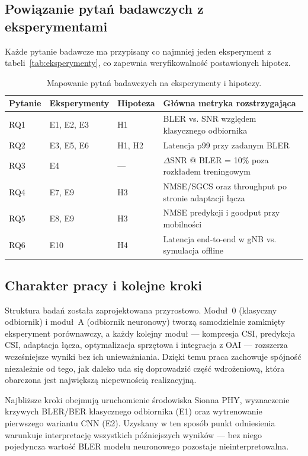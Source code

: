 \documentclass[12pt, a4paper]{article}
\begin{document}
\subsection{Powiązanie pytań badawczych z eksperymentami}

Każde pytanie badawcze ma przypisany co najmniej jeden eksperyment z tabeli~\ref{tab:eksperymenty}, co zapewnia weryfikowalność postawionych hipotez.

\begin{table}[htbp]
\centering
\small
\begin{tabularx}{\textwidth}{@{}l l l X@{}}
\toprule
\textbf{Pytanie} & \textbf{Eksperymenty} & \textbf{Hipoteza} & \textbf{Główna metryka rozstrzygająca} \\
\midrule
RQ1 & E1, E2, E3 & H1 & BLER vs. SNR względem klasycznego odbiornika \\
RQ2 & E3, E5, E6 & H1, H2 & Latencja p99 przy zadanym BLER \\
RQ3 & E4 & --- & $\Delta$SNR @ BLER = 10\% poza rozkładem treningowym \\
RQ4 & E7, E9 & H3 & NMSE/SGCS oraz throughput po stronie adaptacji łącza \\
RQ5 & E8, E9 & H3 & NMSE predykcji i goodput przy mobilności \\
RQ6 & E10 & H4 & Latencja end-to-end w gNB vs. symulacja offline \\
\bottomrule
\end{tabularx}
\caption{Mapowanie pytań badawczych na eksperymenty i hipotezy.}
\label{tab:rq-mapping}
\end{table}

\subsection{Charakter pracy i kolejne kroki}

Struktura badań została zaprojektowana przyrostowo. Moduł~0 (klasyczny odbiornik) i moduł~A (odbiornik neuronowy) tworzą samodzielnie zamknięty eksperyment porównawczy, a każdy kolejny moduł --- kompresja CSI, predykcja CSI, adaptacja łącza, optymalizacja sprzętowa i integracja z OAI --- rozszerza wcześniejsze wyniki bez ich unieważniania. Dzięki temu praca zachowuje spójność niezależnie od tego, jak daleko uda się doprowadzić część wdrożeniową, która obarczona jest największą niepewnością realizacyjną.

Najbliższe kroki obejmują uruchomienie środowiska Sionna PHY, wyznaczenie krzywych BLER/BER klasycznego odbiornika (E1) oraz wytrenowanie pierwszego wariantu CNN (E2). Uzyskany w ten sposób punkt odniesienia warunkuje interpretację wszystkich późniejszych wyników --- bez niego pojedyncza wartość BLER modelu neuronowego pozostaje nieinterpretowalna.
\end{document}
